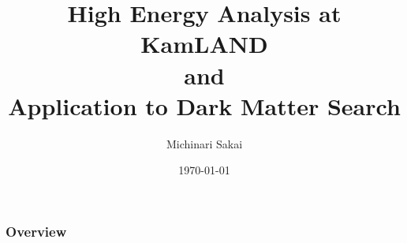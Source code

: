 \documentclass[14pt]{beamer}
\title[KamLAND]{High Energy Analysis at KamLAND\\ and\\ Application to Dark
	Matter Search}
\author{Michinari Sakai} %
\institute[UH] %
{
University of Hawaii, Manoa \\ %
\medskip
\textit{michinar@hawaii.edu} %
}
\date{\today} %
\begin{document}
\begin{frame}
\titlepage %
\end{frame}

\begin{frame}
\frametitle{Overview} %
\tableofcontents %
\end{frame}



\end{document}
